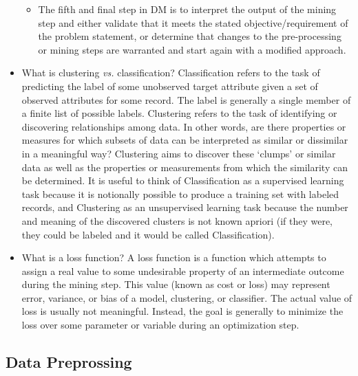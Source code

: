 \documentclass[fleqn,10pt]{SelfArx} %
\begin{document}
\begin{itemize}[noitemsep]
\begin{itemize}
	\item The fifth and final step in DM is to interpret the output of the mining step and either validate that it meets the stated objective/requirement of the problem statement, or determine that changes to the pre-processing or mining steps are warranted and start again with a modified approach.

\end{itemize}

\item What is clustering \textit{vs.} classification?  Classification refers to the task of predicting the label of some unobserved target attribute given a set of observed attributes for some record.  The label is generally a single member of a finite list of possible labels.  Clustering refers to the task of identifying or discovering relationships among data.  In other words, are there properties or measures for which subsets of data can be interpreted as similar or dissimilar in a meaningful way?  Clustering aims to discover these `clumps' or similar data as well as the properties or measurements from which the similarity can be determined.  It is useful to think of Classification as a supervised learning task because it is notionally possible to produce a training set with labeled records, and Clustering as an unsupervised learning task because the number and meaning of the discovered clusters is not known apriori (if they were, they could be labeled and it would be called Classification).

\item What is a loss function? A loss function is a function which attempts to assign a real value to some undesirable property of an intermediate outcome during the mining step.  This value (known as cost or loss) may represent error, variance, or bias of a model, clustering, or classifier.  The actual value of loss is usually not meaningful.  Instead, the goal is generally to minimize the loss over some parameter or variable during an optimization step.

\end{itemize}


\subsection{Data Preprossing}
\end{document}
